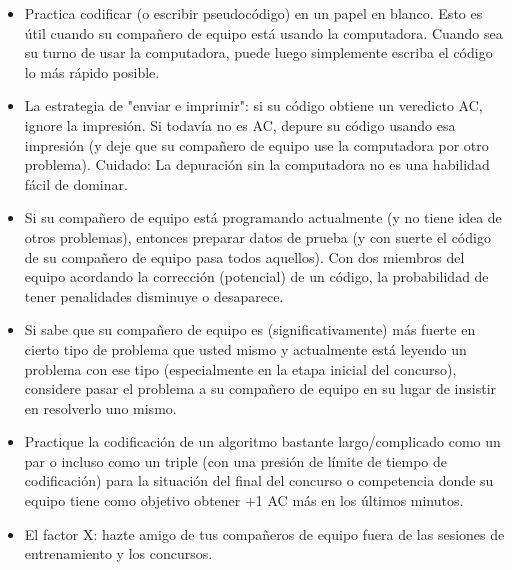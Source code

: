 \begin{itemize}
	\item Practica codificar (o escribir pseudocódigo) en un papel en blanco. Esto es útil cuando su
	compañero de equipo está usando la computadora. Cuando sea su turno de usar la computadora, puede
	luego simplemente escriba el código lo más rápido posible.
	\item La estrategia de "enviar e imprimir": si su código obtiene un veredicto AC, ignore la impresión. Si todavía no es AC, depure su código usando esa impresión (y deje que su compañero de equipo use la computadora por otro problema). Cuidado: La depuración sin la computadora no es una
	habilidad fácil de dominar. 
	\item Si su compañero de equipo está programando actualmente (y no tiene idea de otros problemas), entonces preparar datos de prueba  (y con suerte el código de su compañero de equipo pasa todos
	aquellos). Con dos miembros del equipo acordando la corrección (potencial) de un código, la
	probabilidad de tener penalidades disminuye o desaparece.
	\item Si sabe que su compañero de equipo es (significativamente) más fuerte en cierto tipo de problema que usted mismo y actualmente está leyendo un problema con ese tipo (especialmente en
	la etapa inicial del concurso), considere pasar el problema a su compañero de equipo en su lugar
	de insistir en resolverlo uno mismo.
	\item Practique la codificación de un algoritmo bastante largo/complicado como un par o incluso como un triple (con una presión de límite de tiempo de codificación) para la situación del final del concurso o competencia donde su equipo tiene como objetivo obtener +1 AC más en los últimos minutos.
	\item El factor X: hazte amigo de tus compañeros de equipo fuera de las sesiones de entrenamiento y los concursos.
\end{itemize}